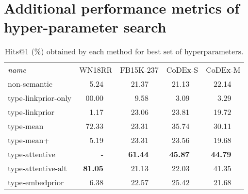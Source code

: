 \section{Additional performance metrics of hyper-parameter search}
\setcounter{table}{0}
\begin{table}
    \def\fn{\hspace{2pt}} %
    \setlength{\tabcolsep}{5pt}
    \centering
    \begin{tabular}{lr@{\fn}lr@{\fn}lr@{\fn}lr@{\fn}l}
        \toprule
        \textit{name}
                &\multicolumn{2}{c}{WN18RR}
                            &\multicolumn{2}{c}{FB15K-237}   
                                           & \multicolumn{2}{c}{CoDEx-S}   
                                                                & \multicolumn{2}{c}{CoDEx-M} \\
        \cmidrule{1-9}
        non-semantic         &  5.24    && {21.37}  && 21.13    && 22.14  \\
        \cmidrule{1-9}
        type-linkprior-only  & 00.00    &&  9.58	&&  3.09    &&  3.29   \\
        type-linkprior       &  1.17	&& 23.06    && 23.81    && 19.72    \\
        \cmidrule{1-9}
        type-mean            & 72.33    && 23.31    && 35.74    && 30.11  \\
        type-mean+           &  5.19    && 23.31    && 23.56    && 19.68  \\
        type-attentive       & -        && \textbf{61.44}    
                                                    && \textbf{45.87}     
                                                                && \textbf{44.79}  \\
        type-attentive-alt   & \textbf{81.05} 
                                        && 21.13    && 22.03    && 41.35  \\
        \cmidrule{1-9}
        type-embedprior      &  6.38    && 22.57    && 25.42    && 21.68  \\
        \bottomrule
    \end{tabular} \vspace{1em}
    \caption[Hits@1 obtained by each method for best set of hyperparameters.]{Hits@1 (\%) obtained by each method for best set of hyperparameters. }\label{tab:hyperparam-search-results3a}
\end{table}

